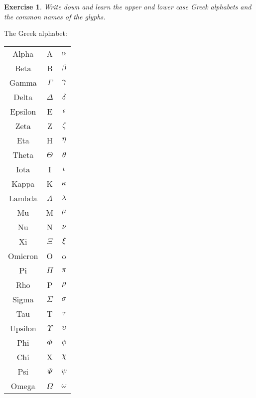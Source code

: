 \documentclass{book}
\newtheorem{exercise}{Exercise}
\begin{document}
\begin{exercise} 
Write down and learn the upper and lower case Greek alphabets and the 
common names of the glyphs.
\end{exercise}
\begin{solution}
The Greek alphabet:

\begin{tabular}{ccc}
Alpha & A & $\alpha$\\
Beta & B & $\beta$\\
Gamma &$\Gamma$ & $\gamma$\\
Delta &$\Delta$ & $\delta$\\
Epsilon & E & $\epsilon$\\
Zeta & Z & $\zeta$\\
Eta & H & $\eta$\\
Theta &$\Theta$ & $\theta$\\
Iota & I & $\iota$\\
Kappa & K & $\kappa$\\
Lambda & $\Lambda$ & $\lambda$\\
Mu & M & $\mu$\\
Nu & N & $\nu$\\
Xi &$\Xi$ & $\xi$\\
Omicron & O & o\\
Pi &$\Pi$ & $\pi$\\
Rho & P &$\rho$\\
Sigma &$\Sigma$ &$\sigma$\\
Tau & T & $\tau$\\
Upsilon &$\Upsilon$ & $\upsilon$\\
Phi &$\Phi$ & $\phi$\\
Chi & X & $\chi$\\
Psi &$\Psi$ & $\psi$\\
Omega &$\Omega$ & $\omega$\\
\end{tabular}
\end{solution}
\end{document}
